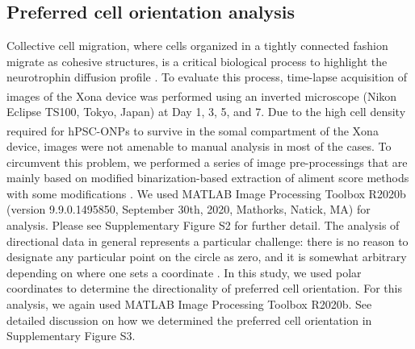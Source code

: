 \documentclass[review]{elsarticle}
\begin{document}
\subsection {Preferred cell orientation analysis}
Collective cell migration, where cells organized in a tightly connected fashion migrate as cohesive structures, is a critical biological process to highlight the neurotrophin diffusion profile \cite{Mazalan2020}. To evaluate this process, time-lapse acquisition of images of the Xona\textsuperscript{\texttrademark} device was performed using an inverted microscope (Nikon Eclipse TS100, Tokyo, Japan) at Day 1, 3, 5, and 7. Due to the high cell density required for hPSC-ONPs to survive in the somal compartment of the Xona\textsuperscript{\texttrademark} device, images were not amenable to manual analysis in most of the cases. To circumvent this problem, we performed a series of image pre-processings that are mainly based on modified binarization-based extraction of aliment score methods with some modifications \cite{Xu2011}. We used MATLAB Image Processing Toolbox R2020b (version 9.9.0.1495850, September 30th, 2020, Mathorks, Natick, MA) for analysis. Please see Supplementary Figure S2 for further detail. The analysis of directional data in general represents a particular challenge: there is no reason to designate any particular point on the circle as zero, and it is somewhat arbitrary depending on where one sets a coordinate \cite{Batschelet1981,Berens2009}. In this study, we used polar coordinates to determine the directionality of preferred cell orientation.  For this analysis, we again used MATLAB Image Processing Toolbox R2020b. See detailed discussion on how we determined the preferred cell orientation in Supplementary Figure S3.
\end{document}
